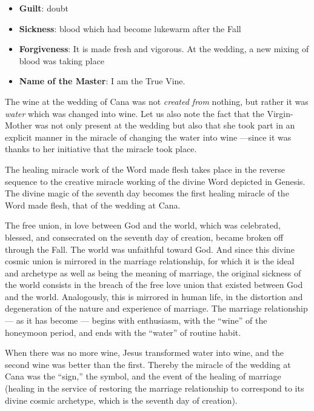 \begin{itemize}
\item \textbf{Guilt}: doubt 
\item \textbf{Sickness}: blood which had become lukewarm after the Fall 
\item \textbf{Forgiveness}: It is made fresh and vigorous. At the wedding, a new mixing of blood was taking place 
\item \textbf{Name of the Master}: I am the True Vine. 
\end{itemize}

\begin{quotex}
The wine at the wedding of Cana was not \emph{created from} nothing, but rather it was \emph{water} which was changed into wine. Let us also note the fact that the Virgin-Mother was not only present at the wedding but also that she took part in an explicit manner in the miracle of changing the water into wine —since it was thanks to her initiative that the miracle took place.

\end{quotex}
The healing miracle work of the Word made flesh takes place in the reverse sequence to the creative miracle working of the divine Word depicted in Genesis. The divine magic of the seventh day becomes the first healing miracle of the Word made flesh, that of the wedding at Cana.

The free union, in love between God and the world, which was celebrated, blessed, and consecrated on the seventh day of creation, became broken off through the Fall. The world was unfaithful toward God. And since this divine cosmic union is mirrored in the marriage relationship, for which it is the ideal and archetype as well as being the meaning of marriage, the original sickness of the world consists in the breach of the free love union that existed between God and the world. Analogously, this is mirrored in human life, in the distortion and degeneration of the nature and experience of marriage. The marriage relationship — as it has become — begins with enthusiasm, with the ``wine'' of the honeymoon period, and ends with the ``water'' of routine habit.

\begin{quotex}
When there was no more wine, Jesus transformed water into wine, and the second wine was better than the first. Thereby the miracle of the wedding at Cana was the ``sign,'' the symbol, and the event of the healing of marriage (healing in the service of restoring the marriage relationship to correspond to its divine cosmic archetype, which is the seventh day of creation).

\end{quotex}

